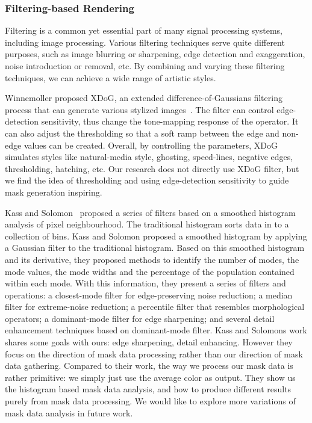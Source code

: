 \subsubsection{Filtering-based Rendering}
Filtering is a common yet essential part of many signal processing systems, including image processing. Various filtering techniques serve quite different purposes, such as image blurring or sharpening, edge detection and exaggeration, noise introduction or removal, etc. By combining and varying these filtering techniques, we can achieve a wide range of artistic styles. 

Winnemoller proposed XDoG, an extended difference-of-Gaussians filtering process that can generate various stylized images~\cite{Winnemoller:2011}. The filter can control edge-detection sensitivity, thus change the tone-mapping response of the operator. It can also adjust the thresholding so that a soft ramp between the edge and non-edge values can be created. Overall, by controlling the parameters, XDoG simulates styles like natural-media style, ghosting, speed-lines, negative edges, thresholding, hatching, etc. Our research does not directly use XDoG filter, but we find the idea of thresholding and using edge-detection sensitivity to guide mask generation inspiring. 

Kass and Solomon~\cite{HistogramFilter} proposed a series of filters based on a smoothed histogram analysis of pixel neighbourhood. The traditional histogram sorts data in to a collection of bins. Kass and Solomon proposed a smoothed histogram by applying a Gaussian filter to the traditional histogram. Based on this smoothed histogram and its derivative, they proposed methods to identify the number of modes, the mode values, the mode widths and the percentage of the population contained within each mode. With this information, they present a series of filters and operations: a closest-mode filter for edge-preserving noise reduction; a median filter for extreme-noise reduction; a percentile filter that resembles morphological operators; a dominant-mode filter for edge sharpening; and several detail enhancement techniques based on dominant-mode filter. Kass and Solomon\textquotesingle s work shares some goals with ours: edge sharpening, detail enhancing. However they focus on the direction of mask data processing rather than our direction of mask data gathering. Compared to their work, the way we process our mask data is rather primitive: we simply just use the average color as output. They show us the histogram based mask data analysis, and how to produce different results purely from mask data processing. We would like to explore more variations of mask data analysis in future work. 

